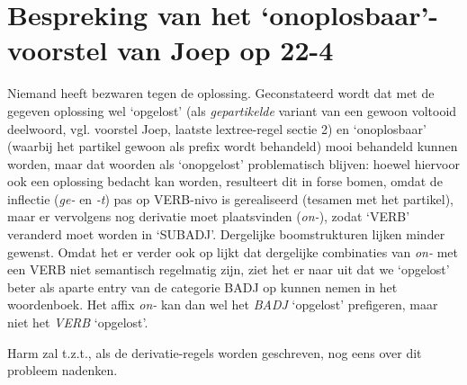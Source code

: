 \section {Bespreking van het `onoplosbaar'-voorstel van Joep op 22-4}

Niemand heeft bezwaren tegen de oplossing. Geconstateerd wordt dat met de 
gegeven oplossing wel `opgelost' (als {\em gepartikelde} variant van een gewoon 
voltooid deelwoord, vgl. voorstel Joep, laatste lextree-regel sectie 2) en 
`onoplosbaar' (waarbij het partikel gewoon als prefix wordt behandeld) 
mooi behandeld kunnen worden, 
maar dat woorden als `onopgelost' problematisch blijven: hoewel hiervoor ook 
een oplossing bedacht kan worden, resulteert dit in forse bomen, omdat de 
inflectie ({\em ge-} en {\em -t}) pas op VERB-nivo is gerealiseerd (tesamen met 
het partikel), maar er vervolgens nog derivatie moet plaatsvinden ({\em on-}),
zodat `VERB' veranderd moet worden in `SUBADJ'. Dergelijke boomstrukturen 
lijken minder gewenst. Omdat het er verder ook op lijkt dat dergelijke 
combinaties van 
{\em on-} met een VERB niet semantisch regelmatig zijn, ziet het er naar uit 
dat we `opgelost' beter als aparte entry van de categorie BADJ op kunnen 
nemen in het woordenboek. Het affix {\em on-} kan dan wel het {\em BADJ}
`opgelost' prefigeren, maar niet het {\em VERB} `opgelost'.

Harm zal t.z.t., als de derivatie-regels worden geschreven, nog eens over dit 
probleem nadenken.


